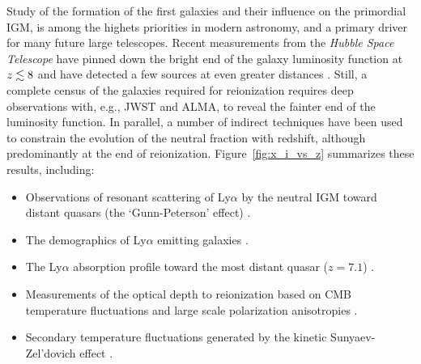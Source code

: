 \documentclass[preprint]{aastex}
\begin{document}

Study of the formation of the first galaxies and their influence on the primordial IGM, is 
among the highets priorities in modern astronomy, 
and a primary driver for many future large telescopes.  Recent measurements from the {\it Hubble Space Telescope} 
have pinned down the bright end of the galaxy luminosity function 
at $z \lesssim 8$ \citep{bouwens_et_al2010, schenker_et_al2013} and have detected a few sources at even greater 
distances \citep{ellis_et_al2013, oesch_et_al2013}. Still, a complete census of the galaxies required for
reionization requires deep observations with, e.g., JWST and ALMA, to reveal the fainter end of the luminosity function. 
In parallel, a number of indirect techniques have been used to constrain the evolution of the neutral fraction
with redshift, although predominantly at the end of reionization. Figure~\ref{fig:x_i_vs_z} summarizes 
these results, including: 

\begin{itemize}[noitemsep,nolistsep]

\item Observations of resonant scattering of Ly$\alpha$ by the neutral IGM toward
distant quasars (the `Gunn-Peterson' effect) \citep{fan_et_al2006}.

\item The demographics of Ly$\alpha$ emitting  galaxies \citep{schenker_et_al2012, treu_et_al2013,Faisst_et_al2014}.

\item The Ly$\alpha$ absorption profile toward the most distant quasar ($z = 7.1$) \citep{bolton_et_al2011}.

\item Measurements of the optical depth to reionization based on CMB temperature fluctuations \citep{planck_et_al2013}
and large scale polarization anisotropies \citep{page_et_al2007}.

\item Secondary temperature fluctuations generated by the kinetic Sunyaev-Zel'dovich effect \citep{zahn_et_al2012_trunc, mesinger_et_al2012}. 

\end{itemize}
\end{document}
